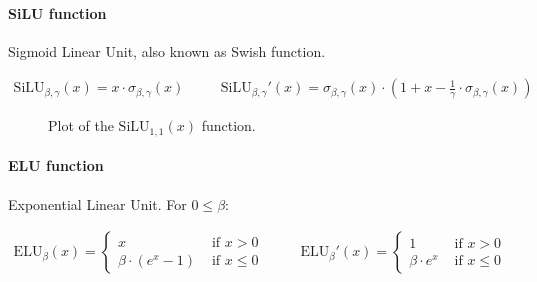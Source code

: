 \documentclass{article}
\begin{document}
        \paragraph{SiLU function}

          Sigmoid Linear Unit, also known as Swish function.

          \begin{align*}
            \text{SiLU}_{\beta, \gamma} (x) = x \cdot \sigma_{\beta, \gamma}(x)
            & \quad &
            \text{SiLU}_{\beta, \gamma}' (x)
              = \sigma_{\beta, \gamma}(x)
                \cdot
                \left(
                  1 + x - \frac{1}{\gamma} \cdot \sigma_{\beta, \gamma}(x)
                \right)
          \end{align*}

          \begin{figure}[!htb]
            \centering
            \caption{%
              Plot of the $\text{SiLU}_{1, 1}(x)$ function.
            }
          \end{figure}

        \paragraph{ELU function}

          Exponential Linear Unit. For $0 \leq \beta$:

          \begin{align*}
            \text{ELU}_\beta (x) =
              \begin{cases}
                x & \text{ if } x > 0 \\
                \beta \cdot (e^x - 1) & \text{ if } x \leq 0
              \end{cases}
            & \quad &
            \text{ELU}_\beta' (x) =
              \begin{cases}
                1 & \text{ if } x > 0 \\
                \beta \cdot e^x & \text{ if } x \leq 0
              \end{cases}
          \end{align*}
\end{document}
